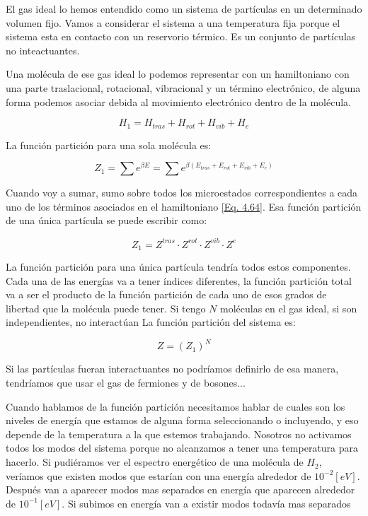 \documentclass[11pt,fleqn]{book}
\begin{document}
El gas ideal lo hemos entendido como un sistema de partículas en un determinado volumen fijo. Vamos a considerar el sistema a una temperatura fija porque el sistema esta en contacto con un reservorio térmico. Es un conjunto de partículas no inteactuantes.



Una molécula de ese gas ideal lo podemos representar con un hamiltoniano con una parte traslacional, rotacional, vibracional y un término electrónico, de alguna forma podemos asociar debida al movimiento electrónico dentro de la molécula.

\begin{equation}
    H_{1}=H_{tras}+H_{rot}+H_{vib}+H_{e}
    \label{Eq. 4.64}
\end{equation}

La función partición para una sola molécula es:

\begin{equation}
    Z_{1}=\sum e^{\beta E}=\sum e^{\beta(E_{tras}+E_{rot}+E_{vib}+E_{e})}
    \label{Eq. 4.65}
\end{equation}

Cuando voy a sumar, sumo sobre todos los microestados correspondientes a cada uno de los términos asociados en el hamiltoniano \ref{Eq. 4.64}. Esa función partición de una única partícula se puede escribir como:

\begin{equation}
    Z_{1}=Z^{tras}\cdot Z^{rot}\cdot Z^{vib}\cdot Z^{e}
    \label{Eq. 4.66}
\end{equation}

La función partición para una única partícula tendría todos estos componentes. Cada una de las energías va a tener índices diferentes, la función partición total va a ser el producto de la función partición de cada uno de esos grados de libertad que la molécula puede tener. Si tengo $N$ moléculas en el gas ideal, si son independientes, no interactúan La función partición del sistema es:

\begin{equation}
    Z=(Z_{1})^{N}
    \label{Eq. 4.67}
\end{equation}

Si las partículas fueran interactuantes no podríamos definirlo de esa manera, tendríamos que usar el gas de fermiones y de bosones...


Cuando hablamos de la función partición necesitamos hablar de cuales son los niveles de energía que estamos de alguna forma seleccionando o incluyendo, y eso depende de la temperatura a la que estemos trabajando. Nosotros no activamos todos los modos del sistema porque no alcanzamos a tener una temperatura para hacerlo. Si pudiéramos ver el espectro energético de una molécula de $H_{2}$, veríamos que existen modos que estarían con una energía alrededor de $10^{-2}[eV]$. Después van a aparecer modos mas separados en energía que aparecen alrededor de $10^{-1} [eV]$. Si subimos en energía van a existir modos todavía mas separados
\end{document}
